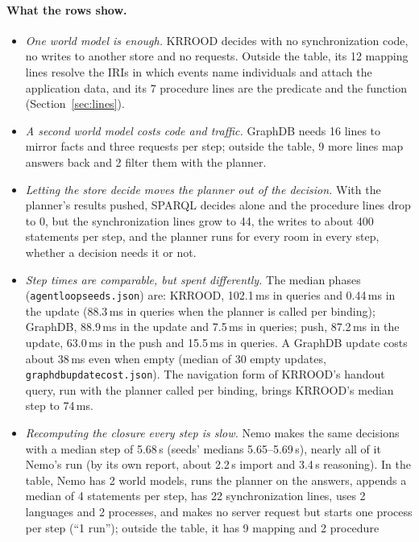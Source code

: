 \documentclass[10pt]{article}
\newcommand{\brkunderscore}{\textunderscore\allowbreak}
\newcommand{\file}[1]{{\let\_\brkunderscore\texttt{#1}}}
\begin{document}
\paragraph{What the rows show.}
\begin{itemize}
  \item \emph{One world model is enough.} KRROOD decides with no synchronization code, no writes to another store and
        no requests. Outside the table, its 12 mapping lines resolve the IRIs in which events name individuals and
        attach the application data, and its 7 procedure lines are the predicate and the function
        (Section~\ref{sec:lines}).
  \item \emph{A second world model costs code and traffic.} GraphDB needs 16 lines to mirror facts and three requests
        per step; outside the table, 9 more lines map answers back and 2 filter them with the planner.
  \item \emph{Letting the store decide moves the planner out of the decision.} With the planner's results pushed, SPARQL
        decides alone and the procedure lines drop to 0, but the synchronization lines grow to 44, the writes to about
        400 statements per step, and the planner runs for every room in every step, whether a decision needs it or
        not.
  \item \emph{Step times are comparable, but spent differently.} The median phases (\file{agent\_loop\_seeds.json})
        are: KRROOD, 102.1\,ms in queries and 0.44\,ms in the update (88.3\,ms in queries when the planner is called per binding); GraphDB, 88.9\,ms in the update and 7.5\,ms in
        queries; push, 87.2\,ms in the update, 63.0\,ms in the push and 15.5\,ms in queries. A GraphDB update costs
        about 38\,ms even when empty (median of 30 empty updates, \file{graphdb\_update\_cost.json}). The navigation
        form of KRROOD's handout query, run with the planner called per binding, brings KRROOD's median step to 74\,ms.
  \item \emph{Recomputing the closure every step is slow.} Nemo makes the same decisions with a median step of 5.68\,s
        (seeds' medians 5.65--5.69\,s), nearly all of it Nemo's run (by its own report, about 2.2\,s import and 3.4\,s
        reasoning). In the table, Nemo has 2 world models, runs the planner on the answers, appends a median of 4
        statements per step, has 22 synchronization lines, uses 2 languages and 2 processes, and makes no server
        request but starts one process per step (``1 run''); outside the table, it has 9 mapping and 2 procedure

\end{itemize}
\end{document}
